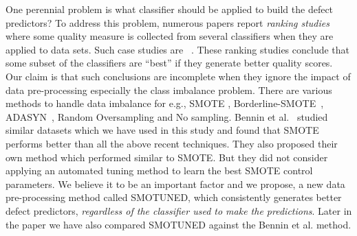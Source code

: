 \documentclass[sigconf,review, anonymous]{acmart}
\theoremstyle{break}
\theoremstyle{break}
\newcommand{\sma}{{\sc SMOTE}}
\newcommand{\smb}{{\sc SMOTUNED}}
\begin{document}
One perennial problem   is what classifier should be applied to build the defect predictors?
To address this problem, numerous papers report {\em ranking studies} where
some quality measure  is collected from  several  classifiers when they are 
 applied to data sets. Such case studies are ~\cite{lessmann2008benchmarking,hall2012systematic,elish2008predicting,menzies2010defect,gondra2008applying,radjenovic2013software,jiang2008techniques,wang2013using,mende2009revisiting,li2012sample,khoshgoftaar2010attribute,jiang2009variance,ghotra2015revisiting,jiang2008can,tantithamthavorn2016automated,fu2016tuning}.
These ranking studies conclude that some subset of the classifiers
are  ``best'' if they generate  better quality scores.
Our claim is that such conclusions are incomplete when
they ignore the impact of  
data pre-processing especially the class imbalance problem. There are various methods to handle data imbalance for e.g., {\sma} \cite{chawla2002smote}, Borderline-SMOTE~\cite{han2005borderline}, ADASYN~\cite{he2008adasyn}, Random Oversampling and No sampling. Bennin et al.~\cite{bennin2017mahakil} studied similar datasets which we have used in this study and found that {\sma} performs better than all the above recent techniques. They also proposed their own method which performed similar to {\sma}. But they did not consider applying an automated tuning method to learn the best SMOTE control parameters. We believe it to be an important factor and we propose,
a new data pre-processing method called {\smb}, which
 consistently generates better 
defect predictors,
{\em regardless of the classifier used
to make the predictions}. Later in the paper we have also compared {\smb} against the Bennin et al. method.
\end{document}
